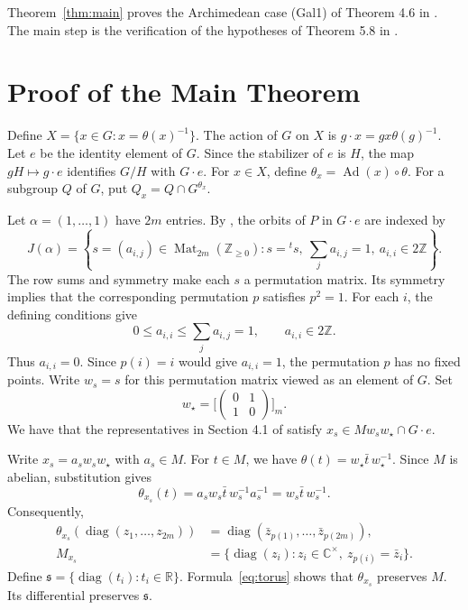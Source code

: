 \documentclass[11pt]{amsart}
\newcommand{\C}{\mathbb C}
\newcommand{\R}{\mathbb R}
\DeclareMathOperator{\Ad}{Ad}
\DeclareMathOperator{\diag}{diag}
\numberwithin{equation}{section}
\begin{document}
Theorem~\ref{thm:main} proves the Archimedean case (Gal1) of Theorem 4.6 in \cite{MOYglobal}.
The main step is the verification of the hypotheses of Theorem 5.8 in \cite{ST}.

\section{Proof of the Main Theorem}

Define $X=\{x\in G:x=\theta(x)^{-1}\}$.
The action of $G$ on $X$ is $g\cdot x=gx\theta(g)^{-1}$.
Let $e$ be the identity element of $G$.
Since the stabilizer of $e$ is $H$, the map $gH\mapsto g\cdot e$
identifies $G/H$ with $G\cdot e$.
For $x\in X$, define $\theta_x=\Ad(x)\circ\theta$.
For a subgroup $Q$ of $G$, put $Q_x=Q\cap G^{\theta_x}$.

Let $\alpha=(1,\ldots,1)$ have $2m$ entries.
By \cite{MOYglobal}, the orbits of $P$ in $G\cdot e$
are indexed by
\[
 J(\alpha)
 =\left\{s=(a_{i,j})\in\operatorname{Mat}_{2m}(\mathbb Z_{\ge0}):
 s={}^ts,\ \sum_j a_{i,j}=1,\ a_{i,i}\in2\mathbb Z\right\}.
\]
The row sums and symmetry make each $s$ a permutation matrix.
Its symmetry implies that the corresponding permutation $p$
satisfies $p^2=1$.
For each $i$, the defining conditions give
\begin{equation}\label{eq:no-fixed-points}
 0\le a_{i,i}\le\sum_j a_{i,j}=1,
 \qquad a_{i,i}\in2\mathbb Z.
\end{equation}
Thus $a_{i,i}=0$.
Since $p(i)=i$ would give $a_{i,i}=1$, the permutation $p$ has
no fixed points.
Write $w_s=s$ for this permutation matrix viewed as an element
of $G$.
Set $$w_\star=\Bigg[\begin{pmatrix}0&1\\1&0\end{pmatrix}\Bigg]_m.$$
We have that the representatives in Section 4.1 of \cite{MOYglobal} satisfy
$x_s\in Mw_sw_\star\cap G\cdot e$.

Write $x_s=a_sw_sw_\star$ with $a_s\in M$.
For $t\in M$, we have $\theta(t)=w_\star\bar t\,w_\star^{-1}$.
Since $M$ is abelian, substitution gives
\[
 \theta_{x_s}(t)
 =a_sw_s\bar t\,w_s^{-1}a_s^{-1}
 =w_s\bar t\,w_s^{-1}.
\]
Consequently,
\begin{equation}\label{eq:torus}
 \begin{aligned}
 \theta_{x_s}(\diag(z_1,\ldots,z_{2m}))
   &=\diag(\bar z_{p(1)},\ldots,\bar z_{p(2m)}),\\
 M_{x_s}&=\{\diag(z_i):z_i\in\C^\times,\ z_{p(i)}=\bar z_i\}.
 \end{aligned}
\end{equation}
Define $\mathfrak s=\{\diag(t_i):t_i\in\R\}$.
Formula~\eqref{eq:torus} shows that $\theta_{x_s}$ preserves $M$.
Its differential preserves $\mathfrak s$.
\end{document}
